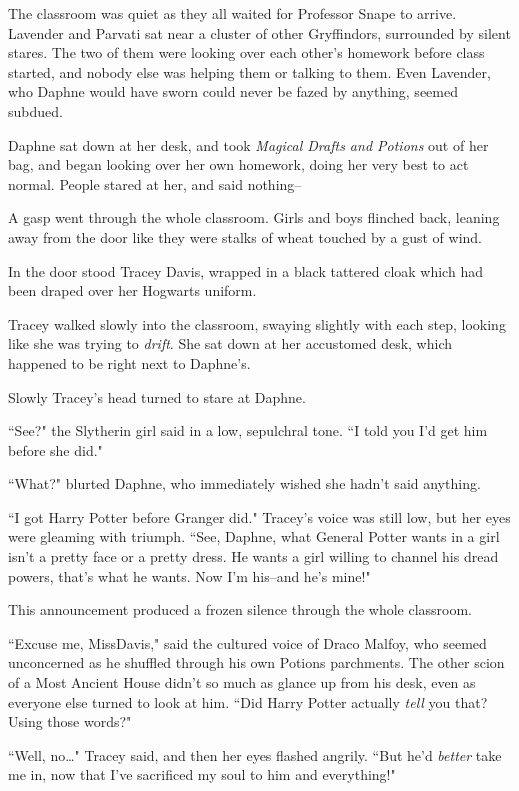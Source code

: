 The classroom was quiet as they all waited for Professor Snape to arrive. Lavender and Parvati sat near a cluster of other Gryffindors, surrounded by silent stares. The two of them were looking over each other's homework before class started, and nobody else was helping them or talking to them. Even Lavender, who Daphne would have sworn could never be fazed by anything, seemed subdued.

Daphne sat down at her desk, and took \emph{Magical Drafts and Potions} out of her bag, and began looking over her own homework, doing her very best to act normal. People stared at her, and said nothing\---

A gasp went through the whole classroom. Girls and boys flinched back, leaning away from the door like they were stalks of wheat touched by a gust of wind.

In the door stood Tracey Davis, wrapped in a black tattered cloak which had been draped over her Hogwarts uniform.

Tracey walked slowly into the classroom, swaying slightly with each step, looking like she was trying to \emph{drift}. She sat down at her accustomed desk, which happened to be right next to Daphne's.

Slowly Tracey's head turned to stare at Daphne.

``See?" the Slytherin girl said in a low, sepulchral tone. ``I told you I'd get him before she did."

``What?" blurted Daphne, who immediately wished she hadn't said anything.

``I got Harry Potter before Granger did." Tracey's voice was still low, but her eyes were gleaming with triumph. ``See, Daphne, what General Potter wants in a girl isn't a pretty face or a pretty dress. He wants a girl willing to channel his dread powers, that's what he wants. Now I'm his\---and he's mine!"

This announcement produced a frozen silence through the whole classroom.

``Excuse me, Miss\?Davis," said the cultured voice of Draco Malfoy, who seemed unconcerned as he shuffled through his own Potions parchments. The other scion of a Most Ancient House didn't so much as glance up from his desk, even as everyone else turned to look at him. ``Did Harry Potter actually \emph{tell} you that? Using those words?"

``Well, no{\ldots}" Tracey said, and then her eyes flashed angrily. ``But he'd \emph{better} take me in, now that I've sacrificed my soul to him and everything!"

